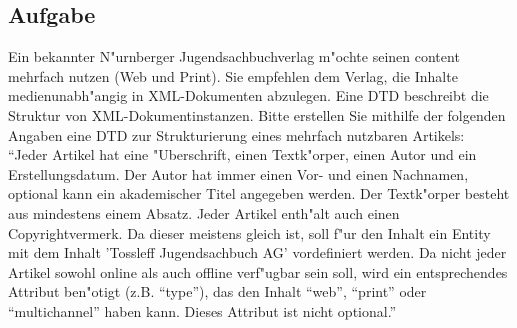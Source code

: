 \subsection{Aufgabe}
Ein bekannter N"urnberger Jugendsachbuchverlag m"ochte seinen content mehrfach nutzen (Web und Print). 
Sie empfehlen dem Verlag, die Inhalte medienunabh"angig in XML-Dokumenten abzulegen.
Eine DTD beschreibt die Struktur von XML-Dokumentinstanzen.
Bitte erstellen Sie mithilfe der folgenden Angaben eine DTD zur Strukturierung eines mehrfach nutzbaren Artikels:\\

"`Jeder Artikel hat eine "Uberschrift, einen Textk"orper, einen Autor und ein Erstellungsdatum.
Der Autor hat immer einen Vor- und einen Nachnamen, optional kann ein akademischer Titel angegeben werden.
Der Textk"orper besteht aus mindestens einem Absatz.
Jeder Artikel enth"alt auch einen Copyrightvermerk.
Da dieser meistens gleich ist, soll f"ur den Inhalt ein Entity mit dem Inhalt 'Tossleff Jugendsachbuch AG' vordefiniert werden.
Da nicht jeder Artikel sowohl online als auch offline verf"ugbar sein soll, wird ein entsprechendes Attribut ben"otigt (z.B. "`type"'), das den Inhalt "`web"', "`print"' oder "`multichannel"' haben kann.
Dieses Attribut ist nicht optional."'\\

